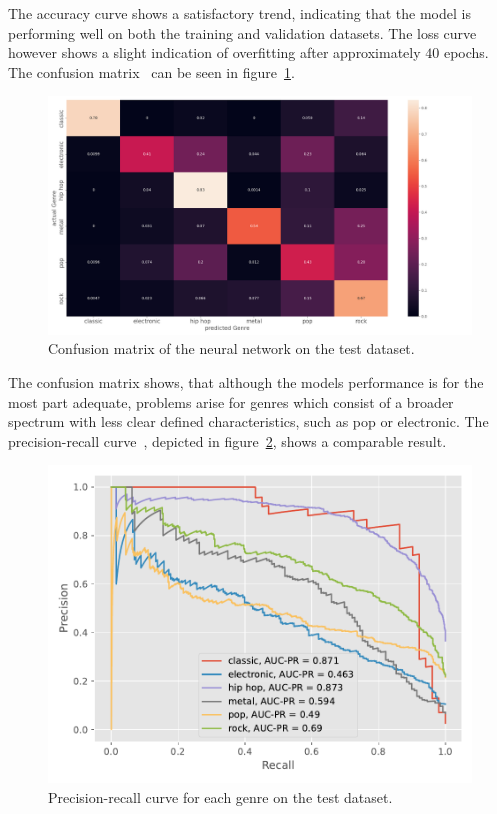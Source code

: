 \documentclass[
  12pt,
  bibliography=totoc,     %
  captions=tableheading,  %
  titlepage=firstiscover, %
]{scrartcl}
\begin{document}
\FloatBarrier
\noindent
The accuracy curve shows a satisfactory trend, indicating that the model is performing well on both the training and validation datasets. The loss curve however
shows a slight indication of overfitting after approximately $40$ epochs.
The confusion matrix~\cite{geron} can be seen in figure~\ref{fig:nn_confusion}.
\begin{figure}[H]
  \centering
  \includegraphics[scale=0.33]{figures/NN/confusion_matrix_nn.png}
  \caption{Confusion matrix of the neural network on the test dataset.}
  \label{fig:nn_confusion}
\end{figure}
\noindent
The confusion matrix shows, that although the models performance is for the most part adequate, problems arise for genres which consist of a broader spectrum with less clear
defined characteristics, such as pop or electronic.
The precision-recall curve~\cite{geron}, depicted in figure~\ref{fig:pr_curve_nn}, shows a comparable result.
\begin{figure}[H]
  \centering
  \includegraphics[scale=0.7]{figures/NN/PR_curve_genres.pdf}
  \caption{Precision-recall curve for each genre on the test dataset.}
  \label{fig:pr_curve_nn}
\end{figure}
\end{document}
